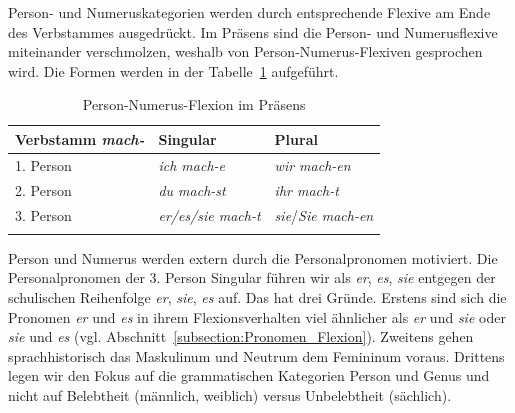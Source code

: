 Person- und Numeruskategorien werden durch entsprechende Flexive am Ende des Verbstammes ausgedrückt. Im Präsens sind die Person- und Numerusflexive miteinander verschmolzen, weshalb von Person-Numerus-Flexiven gesprochen wird. Die Formen werden in der Tabelle~\ref{tab:V_Pers_Num_Flexion} aufgeführt.

\begin{table}
  \centering
  \begin{tabular}{l l l}
    \lsptoprule
    Verbstamm \textit{mach-} & Singular & Plural \\
    \hline
    1. Person & \textit{ich mach-e}  & \textit{wir mach-en} \\
    2. Person & \textit{du mach-st}  & \textit{ihr mach-t} \\
    3. Person & \textit{er/es/sie mach-t} & \textit{sie}/\textit{Sie mach-en} \\
    \lspbottomrule 
  \end{tabular}
  \caption{Person-Numerus-Flexion im Präsens}
  \label{tab:V_Pers_Num_Flexion}
\end{table}

Person und Numerus werden extern durch die Personalpronomen motiviert. Die Personalpronomen der 3. Person Singular führen wir als \textit{er}, \textit{es}, \textit{sie} entgegen der schulischen Reihenfolge \textit{er}, \textit{sie}, \textit{es} auf. Das hat drei Gründe. Erstens sind sich die Pronomen \textit{er} und \textit{es} in ihrem Flexionsverhalten viel ähnlicher als \textit{er} und \textit{sie} oder \textit{sie} und \textit{es} (vgl. Abschnitt~\ref{subsection:Pronomen_Flexion}). Zweitens gehen sprachhistorisch das Maskulinum und Neutrum dem Femininum voraus. Drittens legen wir den Fokus auf die grammatischen Kategorien Person und Genus und nicht auf Belebtheit (männlich, weiblich) versus Unbelebtheit (sächlich). 

